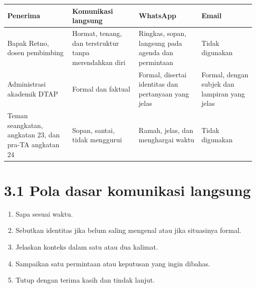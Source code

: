 \documentclass[
  indonesian,
]{article}
\newcounter{none} %
\providecommand{\tightlist}{%
  \setlength{\itemsep}{0pt}\setlength{\parskip}{0pt}}
\renewcommand{\subsection}{\section}
\begin{document}
{\def\LTcaptype{none} %
\begin{longtable}[]{@{}
  >{\raggedright\arraybackslash}p{}
  >{\raggedright\arraybackslash}p{}
  >{\raggedright\arraybackslash}p{}
  >{\raggedright\arraybackslash}p{}@{}}
\toprule\noalign{}
\begin{minipage}[b]{\linewidth}\raggedright
Penerima
\end{minipage} & \begin{minipage}[b]{\linewidth}\raggedright
Komunikasi langsung
\end{minipage} & \begin{minipage}[b]{\linewidth}\raggedright
WhatsApp
\end{minipage} & \begin{minipage}[b]{\linewidth}\raggedright
Email
\end{minipage} \\
\midrule\noalign{}
\endhead
\bottomrule\noalign{}
\endlastfoot
Bapak Retno, dosen pembimbing & Hormat, tenang, dan terstruktur tanpa
merendahkan diri & Ringkas, sopan, langsung pada agenda dan permintaan &
Tidak digunakan \\
Administrasi akademik DTAP & Formal dan faktual & Formal, disertai
identitas dan pertanyaan yang jelas & Formal, dengan subjek dan lampiran
yang jelas \\
Teman seangkatan, angkatan 23, dan pra-TA angkatan 24 & Sopan, santai,
tidak menggurui & Ramah, jelas, dan menghargai waktu & Tidak
digunakan \\
\end{longtable}
}

\subsection{3.1 Pola dasar komunikasi
langsung}\label{pola-dasar-komunikasi-langsung}

\begin{enumerate}
\def\labelenumi{\arabic{enumi}.}
\tightlist
\item
  Sapa sesuai waktu.
\item
  Sebutkan identitas jika belum saling mengenal atau jika situasinya
  formal.
\item
  Jelaskan konteks dalam satu atau dua kalimat.
\item
  Sampaikan satu permintaan atau keputusan yang ingin dibahas.
\item
  Tutup dengan terima kasih dan tindak lanjut.
\end{enumerate}
\end{document}
